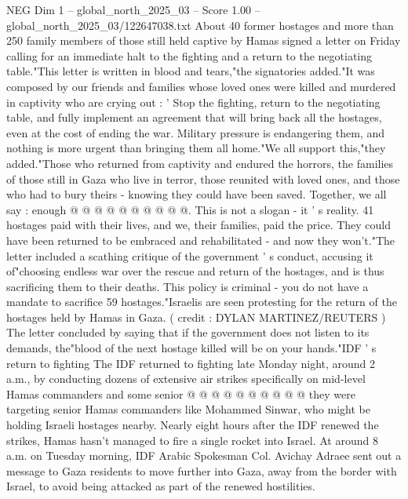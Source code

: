 \begin{textsample}{NEG Dim 1 – global\_north\_2025\_03 – Score 1.00 – global\_north\_2025\_03/122647038.txt}  \label{ex:f1_neg_052}
About 40 former hostages and more than 250 family members of those still held captive by Hamas signed a letter on Friday calling for an immediate halt to the fighting and a return to the negotiating table."This letter is written in blood and tears,"the signatories added."It was composed by our friends and families whose loved ones were killed and murdered in captivity who are crying out : ' Stop the fighting, return to the negotiating table, and fully implement an agreement that will bring back all the hostages, even at the cost of ending the war.
Military pressure is endangering them, and nothing is more urgent than bringing them all home."We all support this,"they added."Those who returned from captivity and endured the horrors, the families of those still in Gaza who live in terror, those reunited with loved ones, and those who had to bury theirs - knowing they could have been saved.
Together, we all say : enough @ @ @ @ @ @ @ @ @ @.
This is not a slogan - it ' s reality. 41 hostages paid with their lives, and we, their families, paid the price.
They could have been returned to be embraced and rehabilitated - and now they won't."The letter included a scathing critique of the government ' s conduct, accusing it of"choosing endless war over the rescue and return of the hostages, and is thus sacrificing them to their deaths.
This policy is criminal - you do not have a mandate to sacrifice 59 hostages."Israelis are seen protesting for the return of the hostages held by Hamas in Gaza. ( credit : DYLAN MARTINEZ/REUTERS ) The letter concluded by saying that if the government does not listen to its demands, the"blood of the next hostage killed will be on your hands."IDF ' s return to fighting The IDF returned to fighting late Monday night, around 2 a.m., by conducting dozens of extensive air strikes specifically on mid-level Hamas commanders and some senior @ @ @ @ @ @ @ @ @ @ they were targeting senior Hamas commanders like Mohammed Sinwar, who might be holding Israeli hostages nearby.
Nearly eight hours after the IDF renewed the strikes, Hamas hasn't managed to fire a single rocket into Israel.
At around 8 a.m. on Tuesday morning, IDF Arabic Spokesman Col.
Avichay Adraee sent out a message to Gaza residents to move further into Gaza, away from the border with Israel, to avoid being attacked as part of the renewed hostilities.

\end{textsample}
